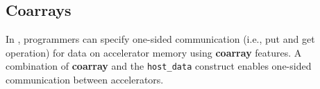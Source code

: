 


\subsection{Coarrays} \label{sec:coarray}

In {\XACC}, programmers can specify one-sided communication (i.e., put
and get operation) for data on accelerator memory using {\bf coarray}
features.
%
A combination of {\bf coarray} and the {\tt host\_data} construct
enables one-sided communication between accelerators.

